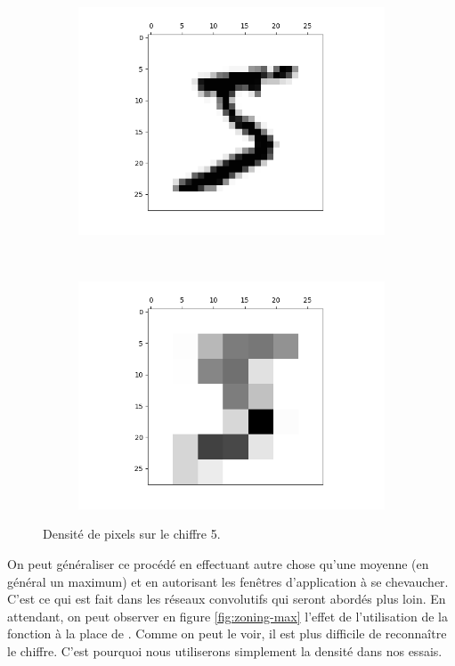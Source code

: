 \begin{figure}
  \centering
  \begin{subfigure}[b]{0.4\textwidth}
    \centering
    \includegraphics[scale=0.4]{assets/training-0}
  \end{subfigure}%
  ~ 
  \begin{subfigure}[b]{0.4\textwidth}
    \centering
    \includegraphics[scale=0.4]{assets/zoning-training-0}
  \end{subfigure}
  \caption{Densité de pixels sur le chiffre 5.}
  \label{fig:zoning}
\end{figure}

On peut généraliser ce procédé en effectuant autre chose qu'une 
moyenne (en général un maximum) et en autorisant les fenêtres 
d'application à se chevaucher. 
C'est ce qui est fait dans les réseaux convolutifs qui seront 
abordés plus loin.
En attendant, on peut observer en figure \ref{fig:zoning-max} 
l'effet de l'utilisation de la fonction  à la 
place de . 
Comme on peut le voir, il est plus difficile de reconnaître 
le chiffre.
C'est pourquoi nous utiliserons simplement la densité dans 
nos essais.

